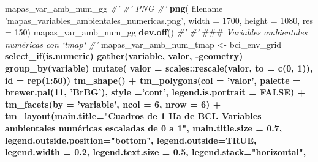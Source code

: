 \documentclass[11pt,]{article}
\newenvironment{Shaded}{\begin{snugshade}}{\end{snugshade}}
\newcommand{\KeywordTok}[1]{\textcolor[rgb]{0.13,0.29,0.53}{\textbf{#1}}}
\newcommand{\DataTypeTok}[1]{\textcolor[rgb]{0.13,0.29,0.53}{#1}}
\newcommand{\DecValTok}[1]{\textcolor[rgb]{0.00,0.00,0.81}{#1}}
\newcommand{\FloatTok}[1]{\textcolor[rgb]{0.00,0.00,0.81}{#1}}
\newcommand{\StringTok}[1]{\textcolor[rgb]{0.31,0.60,0.02}{#1}}
\newcommand{\CommentTok}[1]{\textcolor[rgb]{0.56,0.35,0.01}{\textit{#1}}}
\newcommand{\OtherTok}[1]{\textcolor[rgb]{0.56,0.35,0.01}{#1}}
\newcommand{\OperatorTok}[1]{\textcolor[rgb]{0.81,0.36,0.00}{\textbf{#1}}}
\newcommand{\AlertTok}[1]{\textcolor[rgb]{0.94,0.16,0.16}{#1}}
\newcommand{\NormalTok}[1]{#1}
\begin{document}
\begin{Shaded}
\begin{Highlighting}[]
{{{{{{{\NormalTok{mapas_var_amb_num_gg}
\CommentTok{#'}
\CommentTok{#' PNG}
\CommentTok{#'}
\KeywordTok{png}\NormalTok{(}
  \DataTypeTok{filename =} \StringTok{'mapas_variables_ambientales_numericas.png'}\NormalTok{,}
  \DataTypeTok{width =} \DecValTok{1700}\NormalTok{, }\DataTypeTok{height =} \DecValTok{1080}\NormalTok{, }\DataTypeTok{res =} \DecValTok{150}\NormalTok{)}
\NormalTok{mapas_var_amb_num_gg}
\KeywordTok{dev.off}\NormalTok{()}
\CommentTok{#' }
\CommentTok{#' }\AlertTok{###}\CommentTok{ Variables ambientales numéricas con `tmap`}
\CommentTok{#' }
\NormalTok{mapas_var_amb_num_tmap <-}\StringTok{ }\NormalTok{bci_env_grid }\OperatorTok{%
\StringTok{  }\KeywordTok{select_if}\NormalTok{(is.numeric) }\OperatorTok{%
\StringTok{  }\KeywordTok{gather}\NormalTok{(variable, valor, }\OperatorTok{-}\NormalTok{geometry) }\OperatorTok{%
\StringTok{  }\KeywordTok{group_by}\NormalTok{(variable) }\OperatorTok{%
\StringTok{  }\KeywordTok{mutate}\NormalTok{(}
    \DataTypeTok{valor =}\NormalTok{ scales}\OperatorTok{::}\KeywordTok{rescale}\NormalTok{(valor, }\DataTypeTok{to =} \KeywordTok{c}\NormalTok{(}\DecValTok{0}\NormalTok{, }\DecValTok{1}\NormalTok{)),}
    \DataTypeTok{id =} \KeywordTok{rep}\NormalTok{(}\DecValTok{1}\OperatorTok{:}\DecValTok{50}\NormalTok{)) }\OperatorTok{%
\StringTok{  }\KeywordTok{tm_shape}\NormalTok{() }\OperatorTok{+}
\StringTok{  }\KeywordTok{tm_polygons}\NormalTok{(}\DataTypeTok{col =} \StringTok{'valor'}\NormalTok{,}
              \DataTypeTok{palette =} \KeywordTok{brewer.pal}\NormalTok{(}\DecValTok{11}\NormalTok{, }\StringTok{'BrBG'}\NormalTok{),}
              \DataTypeTok{style =}\StringTok{'cont'}\NormalTok{,}
              \DataTypeTok{legend.is.portrait =} \OtherTok{FALSE}\NormalTok{) }\OperatorTok{+}
\StringTok{  }\KeywordTok{tm_facets}\NormalTok{(}\DataTypeTok{by =} \StringTok{'variable'}\NormalTok{, }\DataTypeTok{ncol =} \DecValTok{6}\NormalTok{, }\DataTypeTok{nrow =} \DecValTok{6}\NormalTok{) }\OperatorTok{+}
\StringTok{  }\KeywordTok{tm_layout}\NormalTok{(}\DataTypeTok{main.title=}\StringTok{"Cuadros de 1 Ha de BCI. Variables ambientales numéricas escaladas de 0 a 1"}\NormalTok{,}
            \DataTypeTok{main.title.size =} \FloatTok{0.7}\NormalTok{,}
            \DataTypeTok{legend.outside.position=}\StringTok{"bottom"}\NormalTok{,}
            \DataTypeTok{legend.outside=}\OtherTok{TRUE}\NormalTok{,}
            \DataTypeTok{legend.width =} \FloatTok{0.2}\NormalTok{,}
            \DataTypeTok{legend.text.size =} \FloatTok{0.5}\NormalTok{,}
            \DataTypeTok{legend.stack=}\StringTok{"horizontal"}\NormalTok{, }
}}}}}}}}}}}}
\end{Highlighting}
\end{Shaded}
\end{document}
